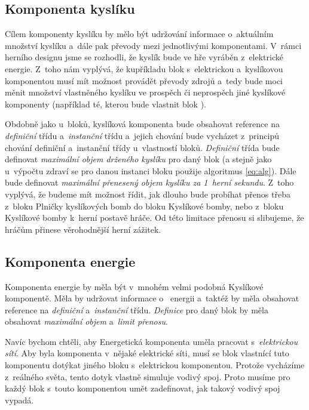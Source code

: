 \subsection{Komponenta kyslíku}

Cílem komponenty kyslíku by mělo být udržování informace o~aktuálním množství  kyslíku a~dále pak převody mezi jednotlivými komponentami. V~rámci herního designu jsme se rozhodli, že kyslík bude ve hře vyráběn z~elektrické energie. Z~toho nám vyplývá, že kupříkladu blok s~elektrickou a~kyslíkovou komponentou musí mít možnost provádět převody zdrojů a~tedy bude moci měnit množství vlastněného kyslíku ve prospěch či neprospěch jiné kyslíkové komponenty (například té, kterou bude vlastnit blok ). 



Obdobně jako u~bloků, kyslíková komponenta bude obsahovat reference na \textit{definiční} třídu a~\textit{instanční} třídu a~jejich chování bude vycházet z~principů chování definiční a~instanční třídy u~vlastností bloků. \textit{Definiční} třída bude definovat \textit{maximální objem drženého kyslíku} pro daný blok (a stejně jako u~výpočtu zdraví se pro danou instanci bloku použije algoritmus \ref{eq:alg}). Dále bude definovat \textit{maximální přenesený objem kyslíku za 1~herní sekundu}. Z~toho vyplývá, že budeme mít možnost řídit, jak dlouho bude probíhat přenos třeba z~bloku Plničky kyslíkových bomb do bloku Kyslíkové bomby, nebo z~bloku Kyslíkové bomby k~herní postavě hráče. Od této limitace přenosu si slibujeme, že hráčům přinese  věrohodnější herní zážitek. 

\subsection{Komponenta energie}

Komponenta energie by měla být v~mnohém velmi podobná Kyslíkové komponentě. Měla by udržovat informace o~ energii a~taktéž by měla obsahovat reference na \textit{definiční} a~\textit{instanční} třídu. \textit{Definice} pro daný blok by měla obsahovat \textit{maximální objem} a~\textit{limit přenosu}. 

Navíc bychom chtěli, aby Energetická komponenta uměla pracovat s~\textit{elektrickou sítí}. Aby byla komponenta v~nějaké elektrické síti, musí se blok vlastnící tuto komponentu dotýkat jiného bloku s~elektrickou komponentou. Protože vycházíme z~reálného světa, tento dotyk vlastně simuluje vodivý spoj. Proto musíme pro každý blok s~touto komponentou umět zadefinovat, jak takový vodivý spoj vypadá.

